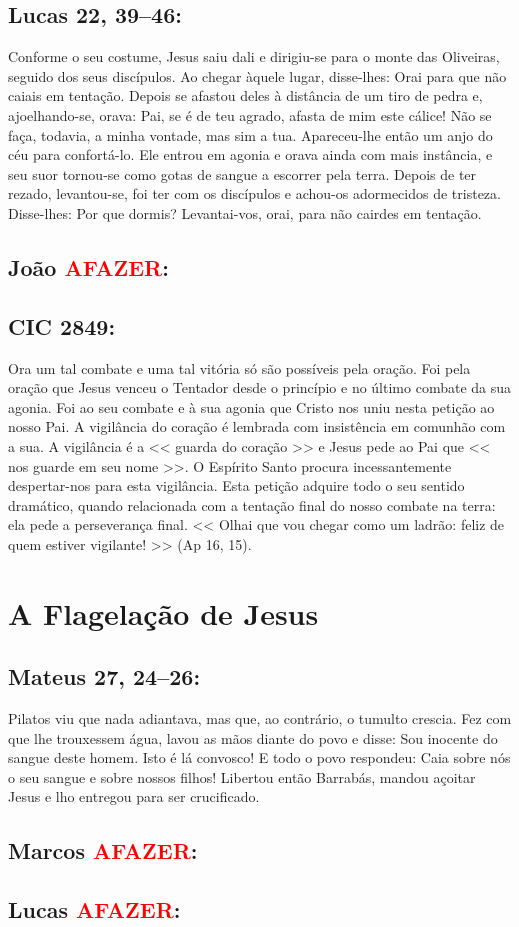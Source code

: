 \documentclass[10pt,a5paper]{book}
\newcommand{\from}[1]{\subsection*{#1}}
\newcommand{\TODO}{\textcolor{red}{\ttfamily AFAZER}}
\begin{document}
\from{Lucas 22, 39--46:}

Conforme o seu costume, Jesus saiu dali e dirigiu-se para o monte das Oliveiras, seguido dos seus discípulos.
Ao chegar àquele lugar, disse-lhes:
Orai para que não caiais em tentação.
Depois se afastou deles à distância de um tiro de pedra e, ajoelhando-se, orava:
Pai, se é de teu agrado, afasta de mim este cálice! Não se faça, todavia, a minha vontade, mas sim a tua.
Apareceu-lhe então um anjo do céu para confortá-lo.
Ele entrou em agonia e orava ainda com mais instância, e seu suor tornou-se como gotas de sangue a escorrer pela terra.
Depois de ter rezado, levantou-se, foi ter com os discípulos e achou-os adormecidos de tristeza.
Disse-lhes:
Por que dormis? Levantai-vos, orai, para não cairdes em tentação.

\from{João \TODO:}

\from{CIC 2849:}

Ora um tal combate e uma tal vitória só são possíveis pela oração.
Foi pela oração que Jesus venceu o Tentador desde o princípio e no último combate da sua agonia.
Foi ao seu combate e à sua agonia que Cristo nos uniu nesta petição ao nosso Pai.
A vigilância do coração é lembrada com insistência em comunhão com a sua.
A vigilância é a << guarda do coração >> e Jesus pede ao Pai que << nos guarde em seu nome >>.
O Espírito Santo procura incessantemente despertar-nos para esta vigilância.
Esta petição adquire todo o seu sentido dramático, quando relacionada com a tentação final do nosso combate na terra:
ela pede a perseverança final.
<< Olhai que vou chegar como um ladrão: feliz de quem estiver vigilante! >> (Ap 16, 15).


\section{A Flagelação de Jesus}

\from{Mateus 27, 24--26:}

Pilatos viu que nada adiantava, mas que, ao contrário, o tumulto crescia.
Fez com que lhe trouxessem água, lavou as mãos diante do povo e disse:
Sou inocente do sangue deste homem.
Isto é lá convosco!
E todo o povo respondeu:
Caia sobre nós o seu sangue e sobre nossos filhos!
Libertou então Barrabás, mandou açoitar Jesus e lho entregou para ser crucificado.

\from{Marcos \TODO:}

\from{Lucas \TODO:}
\end{document}
